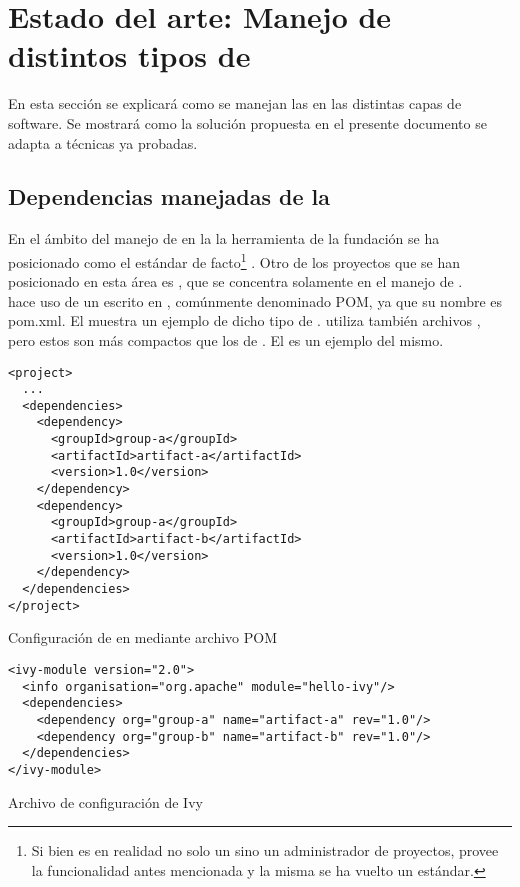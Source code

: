 \section{Estado del arte: Manejo de distintos tipos de \dependencies}
\label{appendix:depmgmnt}

En esta sección se explicará como se manejan las \dependencies en las distintas
capas de software. Se mostrará como la solución propuesta en el presente documento se adapta a técnicas ya probadas.\\

\subsection{Dependencias manejadas de la \logictier}
\label{subsec:depmgmnt:jvm_dev:logic_dependencies}

En el ámbito del manejo de \dependencies en la \logictier la herramienta \maven
de la fundación \apache se ha posicionado como el estándar de facto\footnote{
	Si bien \apache \maven es en realidad no solo un \depmgr sino un 
	administrador de proyectos, provee la funcionalidad antes mencionada y
	la misma se ha vuelto un estándar.
} . Otro de los proyectos que se han posicionado en 
esta área es \apache \ivy, que se concentra solamente en el manejo de 
\dependencies.\\
\maven hace uso de un \conffile escrito en \xml, comúnmente denominado 
POM, ya que su nombre es pom.xml. El 
 muestra un ejemplo de dicho tipo de 
\conffile. \ivy utiliza también archivos \xml, pero estos son más compactos que 
los de \maven. El  es un ejemplo del 
mismo.\\

\begin{listing}[htb]
\begin{verbatim}
<project>
  ...
  <dependencies>
    <dependency>
      <groupId>group-a</groupId>
      <artifactId>artifact-a</artifactId>
      <version>1.0</version>
    </dependency>
    <dependency>
      <groupId>group-a</groupId>
      <artifactId>artifact-b</artifactId>
      <version>1.0</version>
    </dependency>
  </dependencies>
</project>
\end{verbatim}
\caption{Configuración de \dependencies en \maven mediante archivo POM}
\label{code:depmgmnt:jvm:maven_pom}
\end{listing}

\begin{listing}[htb]
\begin{verbatim}
<ivy-module version="2.0">
  <info organisation="org.apache" module="hello-ivy"/>
  <dependencies>
    <dependency org="group-a" name="artifact-a" rev="1.0"/>
    <dependency org="group-b" name="artifact-b" rev="1.0"/>
  </dependencies>
</ivy-module>
\end{verbatim}
\caption{Archivo de configuración de Ivy}
\label{code:depmgmnt:jvm:ivy_module}
\end{listing}

